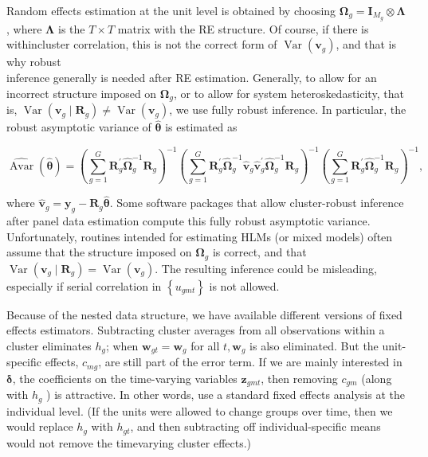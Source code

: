 \documentclass[10pt]{article}
\begin{document}
Random effects estimation at the unit level is obtained by choosing $\boldsymbol{\Omega}_{g}=\mathbf{I}_{M_{g}} \otimes \boldsymbol{\Lambda}$, where $\boldsymbol{\Lambda}$ is the $T \times T$ matrix with the RE structure. Of course, if there is withincluster correlation, this is not the correct form of $\operatorname{Var}\left(\mathbf{v}_{g}\right)$, and that is why robust\\
inference generally is needed after RE estimation. Generally, to allow for an incorrect structure imposed on $\boldsymbol{\Omega}_{g}$, or to allow for system heteroskedasticity, that is, $\operatorname{Var}\left(\mathbf{v}_{g} \mid \mathbf{R}_{g}\right) \neq \operatorname{Var}\left(\mathbf{v}_{g}\right)$, we use fully robust inference. In particular, the robust asymptotic variance of $\hat{\boldsymbol{\theta}}$ is estimated as


\begin{equation*}
\widehat{\operatorname{Avar}}(\hat{\boldsymbol{\theta}})=\left(\sum_{g=1}^{G} \mathbf{R}_{g}^{\prime} \hat{\boldsymbol{\Omega}}_{g}^{-1} \mathbf{R}_{g}\right)^{-1}\left(\sum_{g=1}^{G} \mathbf{R}_{g}^{\prime} \hat{\boldsymbol{\Omega}}_{g}^{-1} \hat{\mathbf{v}}_{g} \hat{\mathbf{v}}_{g}^{\prime} \hat{\boldsymbol{\Omega}}_{g}^{-1} \mathbf{R}_{g}\right)^{-1}\left(\sum_{g=1}^{G} \mathbf{R}_{g}^{\prime} \hat{\boldsymbol{\Omega}}_{g}^{-1} \mathbf{R}_{g}\right)^{-1}, \tag{20.56}
\end{equation*}


where $\hat{\mathbf{v}}_{g}=\mathbf{y}_{g}-\mathbf{R}_{g} \hat{\boldsymbol{\theta}}$. Some software packages that allow cluster-robust inference after panel data estimation compute this fully robust asymptotic variance. Unfortunately, routines intended for estimating HLMs (or mixed models) often assume that the structure imposed on $\boldsymbol{\Omega}_{g}$ is correct, and that $\operatorname{Var}\left(\mathbf{v}_{g} \mid \mathbf{R}_{g}\right)=\operatorname{Var}\left(\mathbf{v}_{g}\right)$. The resulting inference could be misleading, especially if serial correlation in $\left\{u_{g m t}\right\}$ is not allowed.

Because of the nested data structure, we have available different versions of fixed effects estimators. Subtracting cluster averages from all observations within a cluster eliminates $h_{g}$; when $\mathbf{w}_{g t}=\mathbf{w}_{g}$ for all $t, \mathbf{w}_{g}$ is also eliminated. But the unit-specific effects, $c_{m g}$, are still part of the error term. If we are mainly interested in $\boldsymbol{\delta}$, the coefficients on the time-varying variables $\mathbf{z}_{g m t}$, then removing $c_{g m}$ (along with $h_{g}$ ) is attractive. In other words, use a standard fixed effects analysis at the individual level. (If the units were allowed to change groups over time, then we would replace $h_{g}$ with $h_{g t}$, and then subtracting off individual-specific means would not remove the timevarying cluster effects.)
\end{document}
